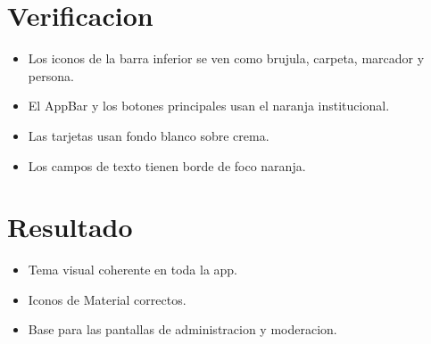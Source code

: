 \section{Verificacion}

\begin{itemize}[leftmargin=*]
  \item Los iconos de la barra inferior se ven como brujula, carpeta, marcador y persona.
  \item El AppBar y los botones principales usan el naranja institucional.
  \item Las tarjetas usan fondo blanco sobre crema.
  \item Los campos de texto tienen borde de foco naranja.
\end{itemize}

\section{Resultado}

\begin{exito}
\begin{itemize}[leftmargin=*]
  \item Tema visual coherente en toda la app.
  \item Iconos de Material correctos.
  \item Base para las pantallas de administracion y moderacion.
\end{itemize}
\end{exito}